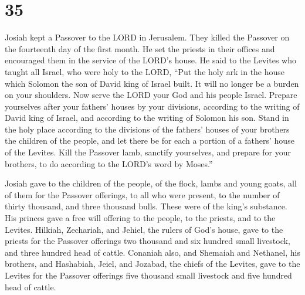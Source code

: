 \hypertarget{section-34}{%
\section{35}\label{section-34}}

 Josiah kept a Passover to the LORD in Jerusalem. They
killed the Passover on the fourteenth day of the first month.
 He set the priests in their offices and encouraged them in
the service of the LORD's house.  He said to the Levites who
taught all Israel, who were holy to the LORD, ``Put the holy ark in the
house which Solomon the son of David king of Israel built. It will no
longer be a burden on your shoulders. Now serve the LORD your God and
his people Israel.  Prepare yourselves after your fathers'
houses by your divisions, according to the writing of David king of
Israel, and according to the writing of Solomon his son. 
Stand in the holy place according to the divisions of the fathers'
houses of your brothers the children of the people, and let there be for
each a portion of a fathers' house of the Levites.  Kill the
Passover lamb, sanctify yourselves, and prepare for your brothers, to do
according to the LORD's word by Moses.''

 Josiah gave to the children of the people, of the flock,
lambs and young goats, all of them for the Passover offerings, to all
who were present, to the number of thirty thousand, and three thousand
bulls. These were of the king's substance.  His princes gave
a free will offering to the people, to the priests, and to the Levites.
Hilkiah, Zechariah, and Jehiel, the rulers of God's house, gave to the
priests for the Passover offerings two thousand and six hundred small
livestock, and three hundred head of cattle.  Conaniah also,
and Shemaiah and Nethanel, his brothers, and Hashabiah, Jeiel, and
Jozabad, the chiefs of the Levites, gave to the Levites for the Passover
offerings five thousand small livestock and five hundred head of cattle.

